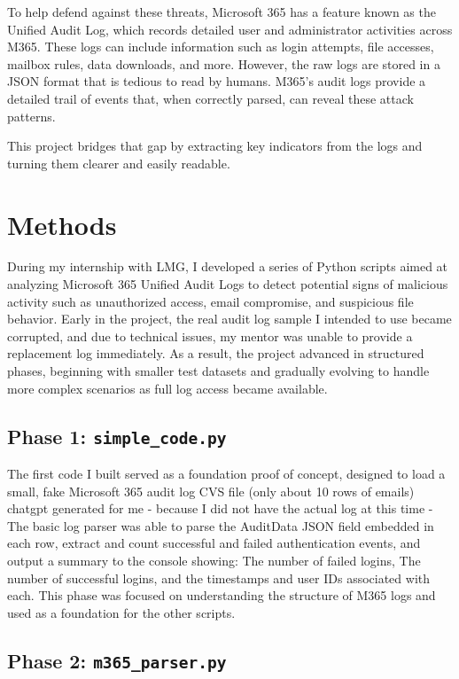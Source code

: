 \documentclass[12pt]{article}
\begin{document}
To help defend against these threats, Microsoft 365 has a feature known as the Unified Audit Log, which records detailed user and administrator activities across M365. These logs can include information such as login attempts, file accesses, mailbox rules, data downloads, and more. However, the raw logs are stored in a JSON format that is tedious to read by humans. M365’s audit logs provide a detailed trail of events that, when correctly parsed, can reveal these attack patterns. 

This project bridges that gap by extracting key indicators from the logs and turning them clearer and easily readable. 


\section{Methods}

During my internship with LMG, I developed a series of Python scripts aimed at analyzing Microsoft 365 Unified Audit Logs to detect potential signs of malicious activity such as unauthorized access, email compromise, and suspicious file behavior. Early in the project, the real audit log sample I intended to use became corrupted, and due to technical issues, my mentor was unable to provide a replacement log immediately. As a result, the project advanced in structured phases, beginning with smaller test datasets and gradually evolving to handle more complex scenarios as full log access became available.

\subsection{Phase 1: \texttt{simple\_code.py}}

The first code I built served as a foundation proof of concept, designed to load a small, fake Microsoft 365 audit log CVS file (only about 10 rows of emails) chatgpt generated for me - because I did not have the actual log at this time - The basic log parser was able to parse the AuditData JSON field embedded in each row, extract and count successful and failed authentication events, and output a summary to the console showing: The number of failed logins, The number of successful logins, and the timestamps and user IDs associated with each. This phase was focused on understanding the structure of M365 logs and used as a foundation for the other scripts. 

\subsection{Phase 2: \texttt{m365\_parser.py}}
\end{document}
